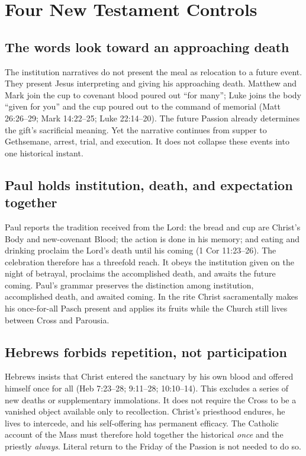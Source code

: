\section{Four New Testament Controls}

\subsection*{The words look toward an approaching death}

The institution narratives do not present the meal as relocation to a future
event. They present Jesus interpreting and giving his approaching death.
Matthew and Mark join the cup to covenant blood poured out ``for many''; Luke
joins the body ``given for you'' and the cup poured out to the command of
memorial (Matt 26:26--29; Mark 14:22--25; Luke 22:14--20). The future Passion
already determines the gift's sacrificial meaning. Yet the narrative continues
from supper to Gethsemane, arrest, trial, and execution. It does not collapse
these events into one historical instant.

\subsection*{Paul holds institution, death, and expectation together}

Paul reports the tradition received from the Lord: the bread and cup are
Christ's Body and new-covenant Blood; the action is done in his memory; and
eating and drinking proclaim the Lord's death until his coming (1 Cor
11:23--26). The celebration therefore has a threefold reach. It obeys the
institution given on the night of betrayal, proclaims the accomplished death,
and awaits the future coming. Paul's grammar preserves the distinction among
institution, accomplished death, and awaited coming. In the rite Christ
sacramentally makes his once-for-all Pasch present and applies its fruits while
the Church still lives between Cross and Parousia.

\subsection*{Hebrews forbids repetition, not participation}

Hebrews insists that Christ entered the sanctuary by his own blood and offered
himself once for all (Heb 7:23--28; 9:11--28; 10:10--14). This excludes a
series of new deaths or supplementary immolations. It does not require the
Cross to be a vanished object available only to recollection. Christ's
priesthood endures, he lives to intercede, and his self-offering has permanent
efficacy. The Catholic account of the Mass must therefore hold together the
historical \emph{once} and the priestly \emph{always}. Literal return to the
Friday of the Passion is not needed to do so.


